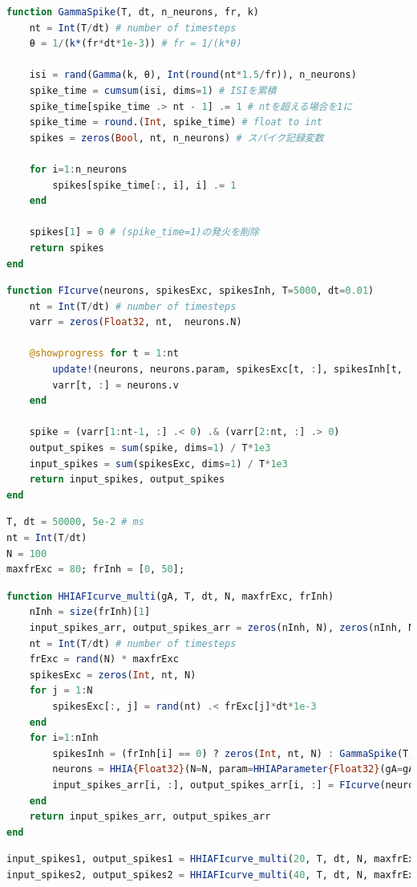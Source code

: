 \begin{lstlisting}[language=julia]
function GammaSpike(T, dt, n_neurons, fr, k)
    nt = Int(T/dt) # number of timesteps
    θ = 1/(k*(fr*dt*1e-3)) # fr = 1/(k*θ)

    isi = rand(Gamma(k, θ), Int(round(nt*1.5/fr)), n_neurons)
    spike_time = cumsum(isi, dims=1) # ISIを累積
    spike_time[spike_time .> nt - 1] .= 1 # ntを超える場合を1に
    spike_time = round.(Int, spike_time) # float to int
    spikes = zeros(Bool, nt, n_neurons) # スパイク記録変数

    for i=1:n_neurons    
        spikes[spike_time[:, i], i] .= 1
    end

    spikes[1] = 0 # (spike_time=1)の発火を削除
    return spikes
end
\end{lstlisting}
\begin{lstlisting}[language=julia]
function FIcurve(neurons, spikesExc, spikesInh, T=5000, dt=0.01)
    nt = Int(T/dt) # number of timesteps
    varr = zeros(Float32, nt,  neurons.N)
    
    @showprogress for t = 1:nt
        update!(neurons, neurons.param, spikesExc[t, :], spikesInh[t, :], dt)
        varr[t, :] = neurons.v
    end
    
    spike = (varr[1:nt-1, :] .< 0) .& (varr[2:nt, :] .> 0)
    output_spikes = sum(spike, dims=1) / T*1e3
    input_spikes = sum(spikesExc, dims=1) / T*1e3
    return input_spikes, output_spikes
end
\end{lstlisting}
\begin{lstlisting}[language=julia]
T, dt = 50000, 5e-2 # ms
nt = Int(T/dt)
N = 100
maxfrExc = 80; frInh = [0, 50]; 
\end{lstlisting}
\begin{lstlisting}[language=julia]
function HHIAFIcurve_multi(gA, T, dt, N, maxfrExc, frInh)
    nInh = size(frInh)[1]
    input_spikes_arr, output_spikes_arr = zeros(nInh, N), zeros(nInh, N)
    nt = Int(T/dt) # number of timesteps
    frExc = rand(N) * maxfrExc
    spikesExc = zeros(Int, nt, N)
    for j = 1:N
        spikesExc[:, j] = rand(nt) .< frExc[j]*dt*1e-3
    end
    for i=1:nInh
        spikesInh = (frInh[i] == 0) ? zeros(Int, nt, N) : GammaSpike(T, dt, N, frInh[i], 12)    
        neurons = HHIA{Float32}(N=N, param=HHIAParameter{Float32}(gA=gA)) # modelの定義
        input_spikes_arr[i, :], output_spikes_arr[i, :] = FIcurve(neurons, spikesExc, spikesInh, T, dt)
    end
    return input_spikes_arr, output_spikes_arr
end
\end{lstlisting}
\begin{lstlisting}[language=julia]
input_spikes1, output_spikes1 = HHIAFIcurve_multi(20, T, dt, N, maxfrExc, frInh);
input_spikes2, output_spikes2 = HHIAFIcurve_multi(40, T, dt, N, maxfrExc, frInh);
\end{lstlisting}
